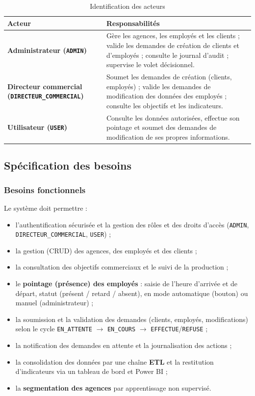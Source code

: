 \begin{table}[htbp]
\centering
\caption{Identification des acteurs}
\label{tab:acteurs}
\renewcommand{\arraystretch}{1.25}
\begin{tabularx}{\textwidth}{>{\bfseries}p{4cm}X}
\toprule
\textmd{\textbf{Acteur}} & \textbf{Responsabilités}\\
\midrule
Administrateur (\texttt{ADMIN}) & Gère les agences, les employés et les clients ;
valide les demandes de création de clients et d'employés ; consulte le journal
d'audit ; supervise le volet décisionnel.\\
Directeur commercial (\texttt{DIRECTEUR\_COMMERCIAL}) & Soumet les demandes de
création (clients, employés) ; valide les demandes de modification des données
des employés ; consulte les objectifs et les indicateurs.\\
Utilisateur (\texttt{USER}) & Consulte les données autorisées, effectue son
pointage et soumet des demandes de modification de ses propres informations.\\
\bottomrule
\end{tabularx}
\end{table}

\subsection{Spécification des besoins}

\subsubsection{Besoins fonctionnels}
Le système doit permettre :
\begin{itemize}[noitemsep]
  \item l'authentification sécurisée et la gestion des rôles et des droits
        d'accès (\texttt{ADMIN}, \texttt{DIRECTEUR\_COMMERCIAL}, \texttt{USER}) ;
  \item la gestion (CRUD) des agences, des employés et des clients ;
  \item la consultation des objectifs commerciaux et le suivi de la production ;
  \item le \textbf{pointage (présence) des employés} : saisie de l'heure d'arrivée
        et de départ, statut (présent / retard / absent), en mode automatique
        (bouton) ou manuel (administrateur) ;
  \item la soumission et la validation des demandes (clients, employés,
        modifications) selon le cycle \texttt{EN\_ATTENTE} $\rightarrow$
        \texttt{EN\_COURS} $\rightarrow$ \texttt{EFFECTUE}/\texttt{REFUSE} ;
  \item la notification des demandes en attente et la journalisation des actions ;
  \item la consolidation des données par une chaîne \textbf{ETL} et la restitution
        d'indicateurs via un tableau de bord et Power BI ;
  \item la \textbf{segmentation des agences} par apprentissage non supervisé.
\end{itemize}

